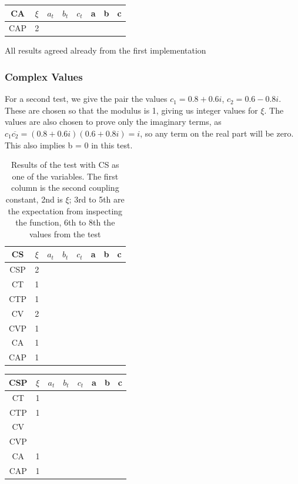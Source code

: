 \documentclass[twocolumn]{article}
\begin{document}
\begin{table}[H]
	\begin{tabular}{|c|c|c|c|c|c|c|c|}
		\hline
		CA & $\xi $& $a_t$ & $b_t$ & $c_t$ & a & b & c \\
		\hline
		CAP & 2 &   &   &   &   &   &   \\
		\hline
	\end{tabular}
\end{table}


All results agreed already from the first implementation

\subsubsection{Complex Values}

For a second test, we give the pair the values $c_1 = 0.8 + 0.6i$, $c_2 = 0.6 - 0.8i$. These are chosen so that the modulus is 1, giving us integer values for $\xi$. The values are also chosen to prove only the imaginary terms, as $c_1\overline{c_2} = (0.8+0.6i)(0.6+0.8i) = i$, so any term on the real part will be zero. This also implies b = 0  in this test.

\begin{table}[H]
	\begin{tabular}{|c|c|c|c|c|c|c|c|}
		\hline
		CS & $\xi $& $a_t$ & $b_t$ & $c_t$ & a & b & c \\
		\hline
		CSP & 2 &   &   &   &   &   &  \\
		\hline
		CT & 1 &   &   &   &   &   &  \\
		\hline
		CTP & 1 &   &   &   &   &   &  \\
		\hline
		CV & 2 &   &   &   &   &   &  \\
		\hline
		CVP & 1 &   &   &   &   &   &  \\
		\hline
		CA & 1 &   &   &   &   &   &  \\
		\hline
		CAP & 1 &   &   &   &   &   &  \\
		\hline
	\end{tabular}
	\caption{Results of the test with CS as one of the variables. The first column is the second coupling constant, 2nd is $\xi$; 3rd to 5th are the expectation from inspecting the function, 6th to 8th the values from the test}
\end{table}

\begin{table}[H]
	\begin{tabular}{|c|c|c|c|c|c|c|c|}
		\hline
		CSP & $\xi $& $a_t$ & $b_t$ & $c_t$ & a & b & c \\
		\hline
		CT & 1 &   &   &   &   &   &   \\
		\hline
		CTP & 1 &   &   &   &   &   &   \\
		\hline
		CV &   &   &   &   &   &   &   \\
		\hline
		CVP &   &   &   &   &   &   &   \\
		\hline
		CA & 1 &   &   &   &   &   &   \\
		\hline
		CAP & 1 &   &   &   &   &   &   \\
		\hline
	\end{tabular}
\end{table}
\end{document}
